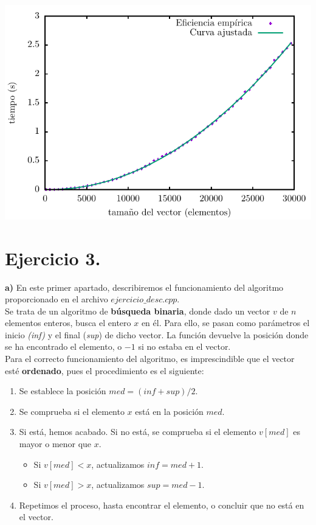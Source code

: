\documentclass[11pt,a4paper]{article}
\begin{document}
\begin{center}
	\includegraphics{img/tiempos_burbuja_ajustado.pdf}
\end{center}

\section*{Ejercicio 3.}

\textbf{a)} En este primer apartado, describiremos el funcionamiento del algoritmo proporcionado en el archivo $ejercicio\_desc.cpp$.\\

Se trata de un algoritmo de \textbf{búsqueda binaria}, donde dado un vector $v$ de $n$ elementos enteros, busca el entero $x$ en él. Para ello, se pasan como parámetros el inicio \textit{(inf)} y el final (\textit{sup}) de dicho vector. La función devuelve la posición donde se ha encontrado el elemento, o $-1$ si no estaba en el vector.\\

Para el correcto funcionamiento del algoritmo, es imprescindible que el vector esté \textbf{ordenado}, pues el procedimiento es el siguiente:

\begin{enumerate}
\item Se establece la posición $med = (inf+sup)/2$.
\item Se comprueba si el elemento $x$ está en la posición $med$.
\item Si está, hemos acabado. Si no está, se comprueba si el elemento $v[med]$ es mayor o menor que $x$.
    \begin{itemize}
    \item Si $v[med] < x$, actualizamos $inf = med + 1$.
    \item Si $v[med] > x$, actualizamos $sup = med - 1$.
    \end{itemize}
\item Repetimos el proceso, hasta encontrar el elemento, o concluir que no está en el vector.
\end{enumerate}
\end{document}
